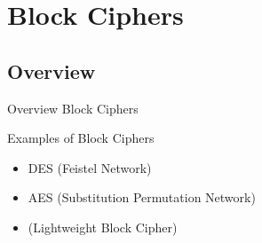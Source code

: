 \section{Block Ciphers}
\subsection{Overview}
\begin{frame}{Overview Block Ciphers}
	\begin{block}{Examples of Block Ciphers}
		\begin{itemize}
			\item DES (Feistel Network)
			\item AES (Substitution Permutation Network)
			\item \present{} (Lightweight Block Cipher)
		\end{itemize}
	\end{block}
\end{frame}

